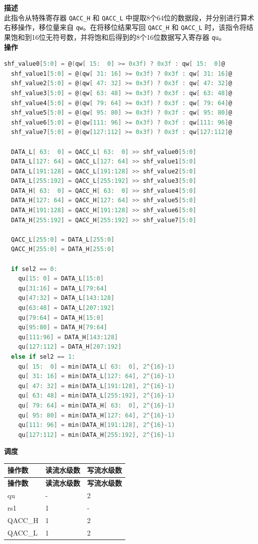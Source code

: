 \textbf{描述}\\
此指令从特殊寄存器 \lstinline{QACC_H} 和 \lstinline{QACC_L} 中提取8个64位的数据段，并分别进行算术右移操作，移位量来自 \lstinline{qw}。在将移位结果写回 \lstinline{QACC_H} 和 \lstinline{QACC_L} 时，该指令将结果饱和到16位无符号数，并将饱和后得到的8个16位数据写入寄存器 \lstinline{qu}。\\
\textbf{操作}
\begin{lstlisting}[language=C, escapechar=@]
  shf_value0[5:0] = @(qw[ 15:  0] >= 0x3f) ? 0x3f : qw[ 15:  0]@
  shf_value1[5:0] = @(qw[ 31: 16] >= 0x3f) ? 0x3f : qw[ 31: 16]@
  shf_value2[5:0] = @(qw[ 47: 32] >= 0x3f) ? 0x3f : qw[ 47: 32]@
  shf_value3[5:0] = @(qw[ 63: 48] >= 0x3f) ? 0x3f : qw[ 63: 48]@
  shf_value4[5:0] = @(qw[ 79: 64] >= 0x3f) ? 0x3f : qw[ 79: 64]@
  shf_value5[5:0] = @(qw[ 95: 80] >= 0x3f) ? 0x3f : qw[ 95: 80]@
  shf_value6[5:0] = @(qw[111: 96] >= 0x3f) ? 0x3f : qw[111: 96]@
  shf_value7[5:0] = @(qw[127:112] >= 0x3f) ? 0x3f : qw[127:112]@

  DATA_L[ 63:  0] = QACC_L[ 63:  0] >> shf_value0[5:0]
  DATA_L[127: 64] = QACC_L[127: 64] >> shf_value1[5:0]
  DATA_L[191:128] = QACC_L[191:128] >> shf_value2[5:0]
  DATA_L[255:192] = QACC_L[255:192] >> shf_value3[5:0]
  DATA_H[ 63:  0] = QACC_H[ 63:  0] >> shf_value4[5:0]
  DATA_H[127: 64] = QACC_H[127: 64] >> shf_value5[5:0]
  DATA_H[191:128] = QACC_H[191:128] >> shf_value6[5:0]
  DATA_H[255:192] = QACC_H[255:192] >> shf_value7[5:0]

  QACC_L[255:0] = DATA_L[255:0]
  QACC_H[255:0] = DATA_H[255:0]

  if sel2 == 0:
    qu[15: 0] = DATA_L[15:0]
    qu[31:16] = DATA_L[79:64]
    qu[47:32] = DATA_L[143:128]
    qu[63:48] = DATA_L[207:192]
    qu[79:64] = DATA_H[15:0]
    qu[95:80] = DATA_H[79:64]
    qu[111:96] = DATA_H[143:128]
    qu[127:112] = DATA_H[207:192]
  else if sel2 == 1:
    qu[ 15:  0] = min(DATA_L[ 63:  0], 2^{16}-1)
    qu[ 31: 16] = min(DATA_L[127: 64], 2^{16}-1)
    qu[ 47: 32] = min(DATA_L[191:128], 2^{16}-1)
    qu[ 63: 48] = min(DATA_L[255:192], 2^{16}-1)
    qu[ 79: 64] = min(DATA_H[ 63:  0], 2^{16}-1)
    qu[ 95: 80] = min(DATA_H[127: 64], 2^{16}-1)
    qu[111: 96] = min(DATA_H[191:128], 2^{16}-1)
    qu[127:112] = min(DATA_H[255:192], 2^{16}-1)
\end{lstlisting}

\textbf{调度}\\
\begin{longtable}[c]{|l|l|l|}
    \hline
    \rowcolor{lightgray}
    \textbf{操作数} & \textbf{读流水级数} & \textbf{写流水级数} \\\hline
    \endfirsthead
    \hline
    \rowcolor{lightgray}
     \textbf{操作数} & \textbf{读流水级数} & \textbf{写流水级数} \\\hline
    \endhead
    \hline
    \endfoot

  qu & - & 2 \\\hline
  rs1 & 1 & - \\\hline
  QACC\_H & 1 & 2 \\\hline
  QACC\_L & 1 & 2

\end{longtable}

